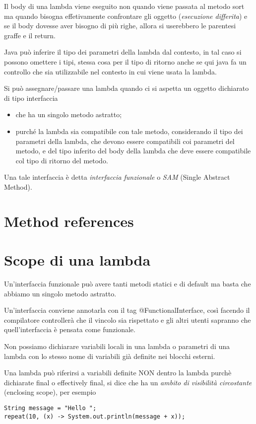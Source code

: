 Il body di una lambda viene eseguito non quando viene passata al metodo sort ma quando bisogna effetivamente confrontare gli oggetto (\textit{esecuzione differita}) e 
se il body dovesse aver bisogno di più righe, allora si userebbero le parentesi graffe e il return.

Java può inferire il tipo dei parametri della lambda dal contesto, in tal caso si possono omettere i tipi, stessa cosa per il tipo di ritorno anche se qui java fa un 
controllo che sia utilizzabile nel contesto in cui viene usata la lambda.

Si può assegnare/passare una lambda quando ci si aspetta un oggetto dichiarato di tipo interfaccia
\begin{itemize}
    \item che ha un singolo metodo astratto;
    \item purché la lambda sia compatibile con tale metodo, considerando il tipo dei parametri della lambda, che devono essere compatibili coi parametri del metodo, 
    e del tipo inferito del body della lambda che deve essere compatibile col tipo di ritorno del metodo.
\end{itemize}

Una tale interfaccia è detta \textit{interfaccia funzionale} o \textit{SAM} (Single Abstract Method).

\section{Method references}


\section{Scope di una lambda}
Un'interfaccia funzionale può avere tanti metodi statici e di default ma basta che abbiamo un singolo metodo astratto. 

Un'interfaccia conviene annotarla con il tag @FunctionalInterface, così facendo il compilatore controllerà che il vincolo sia rispettato e gli altri utenti sapranno 
che quell'interfaccia è pensata come funzionale.

Non possiamo dichiarare variabili locali in una lambda o parametri di una lambda con lo stesso nome di variabili già definite nei blocchi esterni. 

Una lambda può riferirsi a variabili definite NON dentro la lambda purchè dichiarate final o effectively final, si dice che ha un \textit{ambito di visibilità circostante} 
(enclosing scope), per esempio
\begin{lstlisting}
String message = "Hello ";
repeat(10, (x) -> System.out.println(message + x));
\end{lstlisting}

